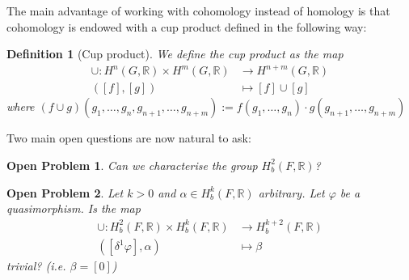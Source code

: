 \documentclass[leqno]{article}
\newtheorem*{definition}{Definition}
\newtheorem*{openproblem}{Open Problem}
\begin{document}
The main advantage of working with cohomology instead of homology is that cohomology is endowed with a cup product defined in the following way:

 \begin{definition}[Cup product] We define the cup product as the map
\begin{align*}
  \cup : H^n(G, \mathbb{R}) \times H^m(G, \mathbb{R}) &\to H^{n+m}(G, \mathbb{R}) \\
  ([f], [g]) & \mapsto [f]\cup [g] 
\end{align*} 
where $(f\cup g)(g_1, \ldots, g_n, g_{n+1}, \ldots, g_{n+m}) := f(g_1, \ldots, g_n)\cdot g(g_{n+1}, \ldots, g_{n+m})$
\end{definition}

Two main open questions are now natural to ask:

\begin{openproblem} Can we characterise the group $H^2_b(F, \mathbb{R})$?
\end{openproblem}

\begin{openproblem} Let  $k>0$ and  $\alpha \in H^k_b(F, \mathbb{R})$ arbitrary. Let $\varphi $ be a quasimorphism. Is  the map
  \begin{align*}
	\cup : H^2_b(F, \mathbb{R}) \times H_b^k(F, \mathbb{R}) &\to H^{k+2}_b(F, \mathbb{R}) \\
	([\delta^1\varphi], \alpha ) &\mapsto \beta 
  \end{align*}
  trivial? (i.e. $\beta =[0]$)
\end{openproblem}
\end{document}
